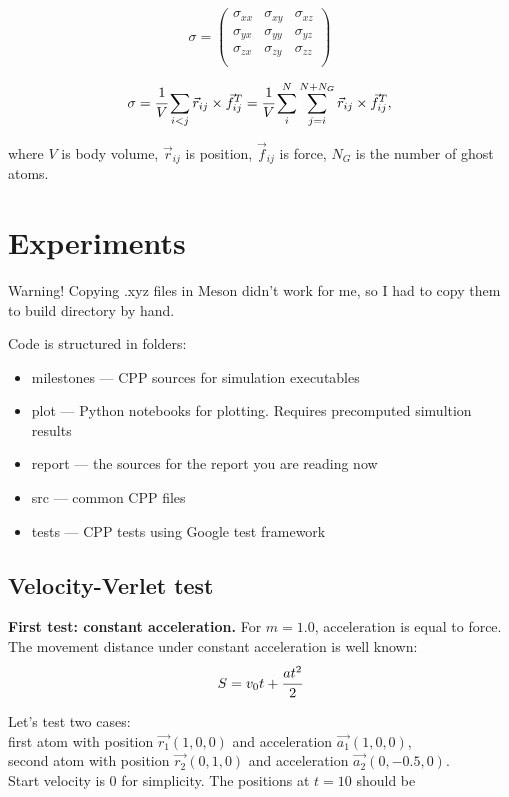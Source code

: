 \documentclass[12pt,a4paper]{article}
\newcommand{\mat}[1]{\vec{#1}}
\begin{document}
\[
\sigma =
\begin{pmatrix}
	\sigma_{xx} &\sigma_{xy} &\sigma_{xz}\\
	\sigma_{yx} &\sigma_{yy} &\sigma_{yz}\\
	\sigma_{zx} &\sigma_{zy} &\sigma_{zz}\\
\end{pmatrix}
\]

\[
\sigma = \cfrac{1}{V} \sum_{i<j} \mat{r}_{ij} \times \mat{f}^T_{ij} = \cfrac{1}{V} \sum_i^{N} \sum_{j=i}^{N+N_G} \mat{r}_{ij} \times \mat{f}^T_{ij},
\]

where $V$ is body volume, $\mat{r}_{ij}$ is position, $\mat{f}_{ij}$ is force, $N_G$ is the number of ghost atoms.


\clearpage

\section{Experiments}
\label{experiments}

Warning! Copying .xyz files in Meson didn't work for me, so I had to copy them to build directory by hand.
	
Code is structured in folders:
\begin{itemize}
	\item milestones --- CPP sources for simulation executables
	\item plot --- Python notebooks for plotting. Requires precomputed simultion results
	\item report --- the sources for the report you are reading now
	\item src --- common CPP files
	\item tests --- CPP tests using Google test framework
\end{itemize}

\subsection*{Velocity-Verlet test}

{\bf First test: constant acceleration.} For $m=1.0$, acceleration is equal to force. The movement distance under constant acceleration is well known: \[ S = v_0 t + \cfrac{at^2}{2} \]

Let's test two cases:\\
first atom with position $\mat{r_1}(1, 0, 0)$ and acceleration $\mat{a_1}(1, 0, 0)$,\\
second atom with position $\mat{r_2}(0, 1, 0)$ and acceleration $\mat{a_2}(0, -0.5, 0)$.\\
Start velocity is 0 for simplicity. The positions at $t = 10$ should be
\end{document}
